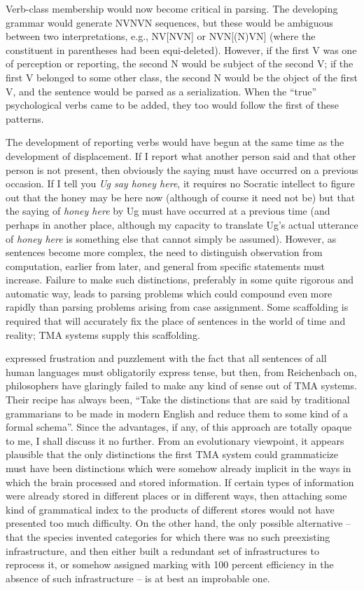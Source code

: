 Verb-class membership would now become critical in parsing.
The developing grammar would generate NVNVN sequences, but these would be ambiguous between two interpretations, e.g., NV[NVN] or NVN[(N)VN] (where the constituent in parentheses had been equi-deleted). However, if the first V was one of perception or reporting, the second N would be subject of the second V; if the first V belonged to some other class, the second N would be the object of the first V, and the sentence would be parsed as a serialization. When the ``true'' psychological verbs came to be added, they too would follow the first of these patterns.

The development of reporting verbs would have begun at the same time as the development of displacement. If I report what another person said and that other person is not present, then obviously the saying must have occurred on a previous occasion. If I tell you \textit{Ug say honey here}, it requires no Socratic intellect to figure out that the honey may be here now (although of course it need not be) but that the saying of \textit{honey here} by Ug must have occurred at a previous time (and perhaps in another place, although my capacity to translate Ug's actual utterance of \textit{honey here} is something else that cannot simply be assumed). However, as sentences become more complex, the need to distinguish observation from computation, earlier from later, and general from specific statements must increase. Failure to make such distinctions, preferably in some quite rigorous and automatic way, leads to parsing problems which could compound even more rapidly than parsing problems arising from case assignment. Some scaffolding is required that will accurately fix the place of sentences in the world of time and reality; TMA systems supply this scaffolding.

\citet[170]{Quine1960} expressed frustration and puzzlement with the fact that all sentences of all human languages must obligatorily express tense, but then, from Reichenbach on, philosophers have glaringly failed to make any kind of sense out of TMA systems. Their recipe has always been, ``Take the distinctions that are said by traditional grammarians to be made in modern English and reduce them to some kind of a formal schema''. Since the advantages, if any, of this approach are totally opaque to me, I shall discuss it no further. From
an evolutionary viewpoint, it appears plausible that the only distinc\-tions the first TMA system could grammaticize must have been distinctions which were somehow already implicit in the ways in which the brain processed and stored information. If certain types of information were already stored in different places or in different ways, then attaching some kind of grammatical index to the products of different stores would not have presented too much difficulty. On the other hand, the only possible alternative -- that the species invented categories for which there was no such preexisting infrastructure, and then either built a redundant set of infrastructures to reprocess it, or somehow assigned marking with 100 percent efficiency in the absence of such infrastructure -- is at best an improbable one.

